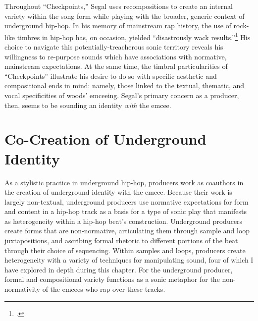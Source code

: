 Throughout ``Checkpoints,'' Segal uses  recompositions to create an internal variety within the song
form while playing with the broader, generic context of underground hip-hop. In his memory of 
mainstream rap history, the use of rock-like timbres in hip-hop has,  on occasion, yielded ``disastrously
wack results.''\footnote{
    \cite{backwoodzhiphopKennySegalPresents2019}.}
His choice to navigate this potentially-treacherous sonic territory reveals his willingness to re-purpose
sounds which have associations with normative, mainstream expectations. At the same time, the timbral
particularities of ``Checkpoints'' illustrate his desire to do so with specific aesthetic
and compositional ends in mind: namely, those linked to the textual, thematic, and vocal specificities
of woods' emceeing. Segal's primary concern as a  producer, then, seems to be sounding an identity
\emph{with} the emcee.

\section{Co-Creation of Underground Identity}
As a stylistic practice in underground hip-hop, producers work as coauthors in the creation of underground
identity with the emcee. Because their work is largely non-textual, underground producers use normative 
expectations for form and content in a hip-hop track as a basis for a type of sonic play that manifests
as heterogeneity within a hip-hop beat's construction. Underground producers create forms that are 
non-normative, articulating them through sample and loop juxtapositions, and ascribing formal rhetoric 
to different portions of the beat through their choice of sequencing. Within samples and loops, producers
create heterogeneity with a variety of techniques for manipulating  sound, four of which I have explored
in depth during this chapter. For the underground producer, formal and compositional variety functions
as a sonic metaphor for the non-normativity of the emcees who rap over these tracks.